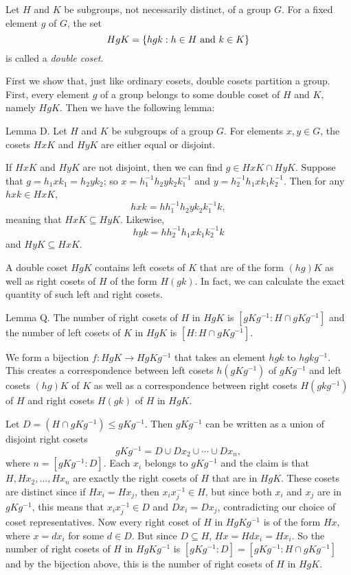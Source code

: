 Let $H$ and $K$ be subgroups, not necessarily distinct, of a group $G$. For a fixed element $g$ of $G$, the set
$$HgK = \{hgk : h\in H\ \hbox{and}\ k\in K\}$$
is called a {\it double coset}.

First we show that, just like ordinary cosets, double cosets partition a group. First, every element $g$ of a group belongs to some double coset of $H$ and $K$, namely $HgK$. Then we have the following lemma:

\proclaim Lemma D. Let $H$ and $K$ be subgroups of a group $G$. For elements $x,y\in G$, the cosets $HxK$ and $HyK$ are either equal or disjoint.

\proof If $HxK$ and $HyK$ are not disjoint, then we can find $g\in HxK \cap HyK$. Suppose that $g = h_1xk_1 = h_2yk_2$; so $x = h_1^{-1}h_2yk_2k_1^{-1}$ and $y = h_2^{-1}h_1xk_1k_2^{-1}$. Then for any $hxk\in HxK$,
$$hxk = hh_1^{-1}h_2yk_2k_1^{-1}k,$$
meaning that $HxK\subseteq HyK$. Likewise,
$$hyk = hh_2^{-1}h_1xk_1k_2^{-1}k$$
and $HyK\subseteq HxK$.\slug

A double coset $HgK$ contains left cosets of $K$ that are of the form $(hg)K$ as well as right cosets of $H$ of the form $H(gk)$. In fact, we can calculate the exact quantity of such left and right cosets.

\proclaim Lemma Q. The number of right cosets of $H$ in $HgK$ is $[gKg^{-1} : H\cap gKg^{-1}]$ and the number of left cosets of $K$ in $HgK$ is $[H : H\cap gKg^{-1}]$.

\proof We form a bijection $f:HgK\rightarrow HgKg^{-1}$ that takes an element $hgk$ to $hgkg^{-1}$. This creates a correspondence between left cosets $h(gKg^{-1})$ of $gKg^{-1}$ and left cosets $(hg)K$ of $K$ as well as a correspondence between right cosets $H(gkg^{-1})$ of $H$ and right cosets $H(gk)$ of $H$ in $HgK$.

Let $D = (H\cap gKg^{-1}) \leq gKg^{-1}$. Then $gKg^{-1}$ can be written as a union of disjoint right cosets
$$gKg^{-1} = D \cup Dx_2 \cup \cdots \cup Dx_n,$$
where $n = [gKg^{-1} : D]$. Each $x_i$ belongs to $gKg^{-1}$ and the claim is that $H, Hx_2, \ldots, Hx_n$ are exactly the right cosets of $H$ that are in $HgK$. These cosets are distinct since if $Hx_i = Hx_j$, then $x_ix_j^{-1}\in H$, but since both $x_i$ and $x_j$ are in $gKg^{-1}$, this means that $x_ix_j^{-1}\in D$ and $Dx_i = Dx_j$, contradicting our choice of coset representatives. Now every right coset of $H$ in $HgKg^{-1}$ is of the form $Hx$, where $x = dx_i$ for some $d\in D$. But since $D\subseteq H$, $Hx = Hdx_i = Hx_i$. So the number of right cosets of $H$ in $HgKg^{-1}$ is $[gKg^{-1} :  D] = [gKg^{-1} : H\cap gKg^{-1}]$ and by the bijection above, this is the number of right cosets of $H$ in $HgK$.

